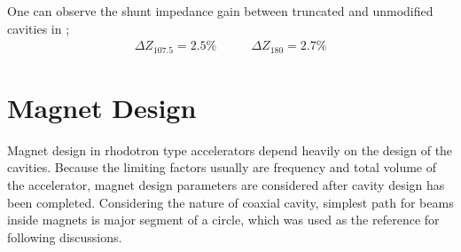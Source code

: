 \documentclass[a4paper,oneside,12pt]{report}
\numberwithin{equation}{chapter}
\begin{document}
One can observe the shunt impedance gain between truncated and unmodified cavities in ;
\begin{equation*}
    \begin{aligned}
        \Delta Z_{107.5}=2.5\%
    \end{aligned}
    \qquad
    \begin{aligned}
        \Delta Z_{180}=2.7\%
    \end{aligned}
\end{equation*}




\newpage



\section{Magnet Design} \label{sec:magnet_design}
Magnet design in rhodotron type accelerators depend heavily on the design of the cavities.
Because the limiting factors usually are frequency and total volume of the accelerator, magnet design parameters are considered after cavity design has been completed.
Considering the nature of coaxial cavity, simplest path for beams inside magnets is major segment of a circle, which was used as the reference for following discussions.
\end{document}
